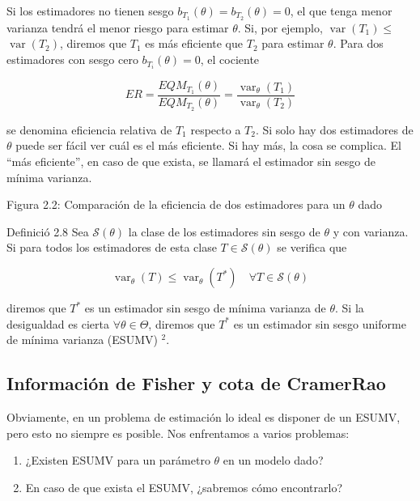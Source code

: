 \documentclass[
]{article}
\providecommand{\tightlist}{%
  \setlength{\itemsep}{0pt}\setlength{\parskip}{0pt}}
\begin{document}
Si los estimadores no tienen sesgo \(b_{T_{1}}(\theta)=b_{T_{2}}(\theta)=0\), el que tenga menor varianza tendrá el menor riesgo para estimar \(\theta\). Si, por ejemplo, \(\operatorname{var}\left(T_{1}\right) \leq\) \(\operatorname{var}\left(T_{2}\right)\), diremos que \(T_{1}\) es más eficiente que \(T_{2}\) para estimar \(\theta\).
Para dos estimadores con sesgo cero \(b_{T_{i}}(\theta)=0\), el cociente

\[
E R=\frac{E Q M_{T_{1}}(\theta)}{E Q M_{T_{2}}(\theta)}=\frac{\operatorname{var}_{\theta}\left(T_{1}\right)}{\operatorname{var}_{\theta}\left(T_{2}\right)}
\]

se denomina eficiencia relativa de \(T_{1}\) respecto a \(T_{2}\). Si solo hay dos estimadores de \(\theta\) puede ser fácil ver cuál es el más eficiente. Si hay más, la cosa se complica. El ``más eficiente'', en caso de que exista, se llamará el estimador sin sesgo de mínima varianza.

Figura 2.2: Comparación de la eficiencia de dos estimadores para un \(\theta\) dado

Definició 2.8 Sea \(\mathcal{S}(\theta)\) la clase de los estimadores sin sesgo de \(\theta\) y con varianza. Si para todos los estimadores de esta clase \(T \in \mathcal{S}(\theta)\) se verifica que

\[
\operatorname{var}_{\theta}(T) \leq \operatorname{var}_{\theta}\left(T^{*}\right) \quad \forall T \in \mathcal{S}(\theta)
\]

diremos que \(T^{*}\) es un estimador sin sesgo de mínima varianza de \(\theta\). Si la desigualdad es cierta \(\forall \theta \in \Theta\), diremos que \(T^{*}\) es un estimador sin sesgo uniforme de mínima varianza (ESUMV) \({ }^{2}\).

\subsection{Información de Fisher y cota de CramerRao}\label{informaciuxf3n-de-fisher-y-cota-de-cramerrao}

Obviamente, en un problema de estimación lo ideal es disponer de un ESUMV, pero esto no siempre es posible. Nos enfrentamos a varios problemas:

\begin{enumerate}
\def\labelenumi{\arabic{enumi}.}
\tightlist
\item
  ¿Existen ESUMV para un parámetro \(\theta\) en un modelo dado?
\item
  En caso de que exista el ESUMV, ¿sabremos cómo encontrarlo?
\end{enumerate}
\end{document}
